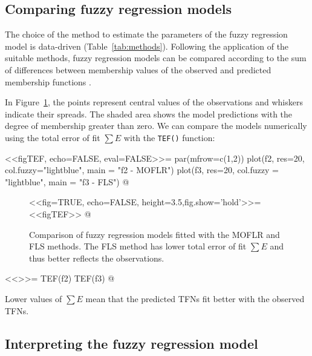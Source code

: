 \documentclass[a4paper]{article}
\begin{document}
\subsection{Comparing fuzzy regression models}

The choice of the method to estimate the parameters of the fuzzy regression model
is data-driven (Table~\ref{tab:methods}). Following the application of the suitable
methods, fuzzy regression models can be compared according to the sum of differences
between membership values of the observed and predicted membership functions
\cite{ref:KimBishu1998}.

In Figure~\ref{fig:TEF}, the points represent central values of the observations and
whiskers indicate their spreads. The shaded area shows the model predictions with the
degree of membership greater than zero. We can
compare the models numerically using the total error of fit $\sum{E}$ \cite{ref:KimBishu1998}
with the \texttt{TEF()} function:

<<figTEF, echo=FALSE, eval=FALSE>>=
par(mfrow=c(1,2))
plot(f2, res=20, col.fuzzy="lightblue", main = "f2 - MOFLR")
plot(f3, res=20, col.fuzzy = "lightblue", main = "f3 - FLS")
@


\begin{figure}[h]
  \begin{center}
<<fig=TRUE, echo=FALSE, height=3.5,fig.show='hold'>>=
<<figTEF>>
@
\end{center}
\caption{Comparison of fuzzy regression models fitted with the MOFLR and FLS methods. The FLS
   method has lower total error of fit $\sum{E}$ and thus better reflects the observations.}
\label{fig:TEF}
\end{figure}


<<>>=
TEF(f2)
TEF(f3)
@

Lower values of $\sum{E}$ mean that the predicted TFNs fit better with the observed TFNs.




\subsection{Interpreting the fuzzy regression model}
\label{chapter:interpretation}
\end{document}

